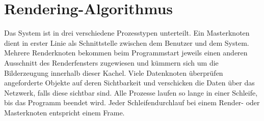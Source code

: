 \section{Rendering-Algorithmus}
\label{sec:impl:renderalgo}

Das System ist in drei verschiedene Prozesstypen unterteilt. Ein Masterknoten dient in erster Linie als Schnittstelle zwischen dem Benutzer und dem System. Mehrere Renderknoten bekommen beim Programmstart jeweils einen anderen Ausschnitt des Renderfensters zugewiesen und kümmern sich um die Bilderzeugung innerhalb dieser Kachel. Viele Datenknoten überprüfen angeforderte Objekte auf deren Sichtbarkeit und verschicken die Daten über das Netzwerk, falls diese sichtbar sind. Alle Prozesse laufen so lange in einer Schleife, bis das Programm beendet wird. Jeder Schleifendurchlauf bei einem Render- oder Masterknoten entspricht einem Frame.\\
